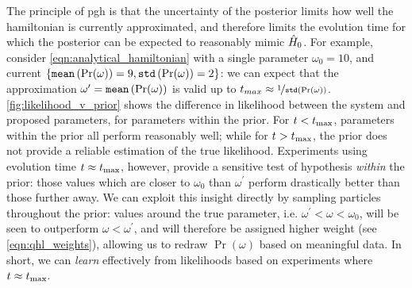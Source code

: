 The principle of \gls{pgh} is that the uncertainty of the posterior limits how well the \gls{hamiltonian} is currently 
    approximated\footnotemark, and therefore limits the evolution time for which the posterior can be expected to 
    reasonably mimic $\hat{H}_0$.
For example, consider \cref{eqn:analytical_hamiltonian} with a single parameter $\omega_0 = 10$,
    and current $\{\texttt{mean}\left(\Pr(\omega)\right) = 9, \texttt{std}\left(\Pr(\omega)\right) = 2\}$:
    we can expect that the approximation $\omega^{\prime} = \texttt{mean}\left(\Pr(\omega)\right)$ 
    is valid up to $t_{max} \approx \nicefrac{1}{\texttt{std}\left(\Pr(\omega)\right)}$.
\cref{fig:likelihood_v_prior} shows the difference in \gls{likelihood} between the system and 
    proposed parameters, for parameters within the prior.
For $t < t_{\rm{max}}$, parameters within the prior all perform reasonably well; 
    while for $t > t_{\rm{max}}$, the prior does not provide a reliable estimation of the true likelihood.
Experiments using evolution time $t \approx t_{\rm{max}}$, however, provide a sensitive test of hypothesis 
    \emph{within} the prior: 
    those values which are closer to $\omega_0$ than $\omega^{\prime}$ perform drastically better than 
    those further away. 
We can exploit this insight directly by sampling particles throughout the prior:
    values around the true parameter, i.e. $\omega^{\prime} < \omega < \omega_0$,
    will be seen to outperform $\omega < \omega^{\prime}$, 
    and will therefore be assigned higher weight (see \cref{eqn:qhl_weights}),
    allowing us to redraw $\Pr(\omega)$ based on meaningful data.
In short, we can \emph{learn} effectively from likelihoods based on experiments where $t \approx t_{\rm{max}}$. 

